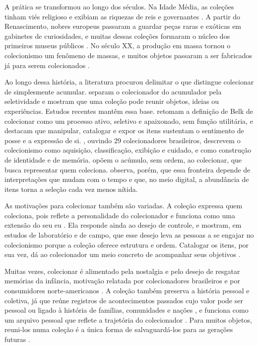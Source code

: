 A prática se transformou ao longo dos séculos. Na Idade Média, as coleções tinham viés religioso e exibiam as riquezas de reis e governantes
\cite{Sundstrom2020}. A partir do Renascimento, nobres europeus passaram a guardar peças raras e exóticas em gabinetes de curiosidades, e muitas dessas
coleções formaram o núcleo dos primeiros museus públicos \cite{Finardi2020,Oliveira2017,CasadoRigalt2020}. No século XX, a produção em massa tornou o
colecionismo um fenômeno de massas, e muitos objetos passaram a ser fabricados já para serem colecionados \cite{Oliveira2017,Sundstrom2020,Finardi2020}.

Ao longo dessa história, a literatura procurou delimitar o que distingue colecionar de simplesmente acumular.  separam o
colecionador do acumulador pela seletividade e mostram que uma coleção pode reunir objetos, ideias ou experiências. Estudos recentes mantêm essa base.
 retomam a definição de Belk de colecionar como um processo ativo, seletivo e apaixonado, sem função utilitária, e destacam que manipular,
catalogar e expor os itens sustentam o sentimento de posse e a expressão de si. , ouvindo 29 colecionadores brasileiros, descrevem o
colecionismo como aquisição, classificação, exibição e cuidado, e como construção de identidade e de memória.  opõem o acúmulo, sem
ordem, ao colecionar, que busca representar quem coleciona.  observa, porém, que essa fronteira depende de interpretações que mudam com o
tempo e que, no meio digital, a abundância de itens torna a seleção cada vez menos nítida.

As motivações para colecionar também são variadas. A coleção expressa quem coleciona, pois reflete a personalidade do colecionador e funciona como uma extensão
do seu eu \cite{Silva2020,Oliveira2017,Correia2026}. Ela responde ainda ao desejo de controle, e  mostram, em estudos de laboratório e de
campo, que esse desejo leva as pessoas a se engajar no colecionismo porque a coleção oferece estrutura e ordem. Catalogar os itens, por sua vez, dá ao
colecionador um meio concreto de acompanhar seus objetivos \cite{Silva2020}.

Muitas vezes, colecionar é alimentado pela nostalgia e pelo desejo de resgatar memórias da infância, motivação relatada por colecionadores brasileiros e por
consumidores norte-americanos \cite{Correia2024,Correia2026,JohnsonJorgensen2023,Silva2020}. A coleção também preserva a história pessoal e coletiva, já que
reúne registros de acontecimentos passados cujo valor pode ser pessoal ou ligado à história de famílias, comunidades e nações \cite{Finardi2020}, e
funciona como um arquivo pessoal que reflete a trajetória do colecionador \cite{Silva2020}. Para muitos objetos, reuni-los numa coleção é a única forma
de salvaguardá-los para as gerações futuras \cite{Oliveira2017}.

